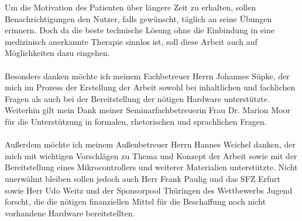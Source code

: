 Um die Motivation des Patienten über längere Zeit zu erhalten, sollen Benachrichtigungen den Nutzer, falls gewünscht, täglich an seine Übungen erinnern. Doch da die beste technische Lösung ohne die Einbindung in eine medizinisch anerkannte Therapie sinnlos ist, soll diese Arbeit auch auf Möglichkeiten dazu eingehen. \\ \\
Besonders danken möchte ich meinem Fachbetreuer Herrn Johannes Süpke, der mich im Prozess der Erstellung der Arbeit sowohl bei inhaltlichen und fachlichen Fragen als auch bei der Bereitstellung der nötigen Hardware unterstützte. Weiterhin gilt mein Dank meiner Seminarfachbetreuerin Frau Dr. Marion Moor für die Unterstützung in formalen, rhetorischen und sprachlichen Fragen. \\ \\
Außerdem möchte ich meinem Außenbetreuer Herrn Hannes Weichel danken, der mich mit wichtigen Vorschlägen zu Thema und Konzept der Arbeit sowie mit der Bereitstellung eines Mikrocontrollers und weiterer Materialien unterstützte. Nicht unerwähnt bleiben sollen jedoch auch Herr Frank Paulig und das SFZ Erfurt sowie Herr Udo Weitz und der Sponsorpool Thüringen des Wettbewerbs \glqq Jugend forscht\grqq , die die nötigen finanziellen Mittel für die Beschaffung noch nicht vorhandene Hardware bereitstellten.